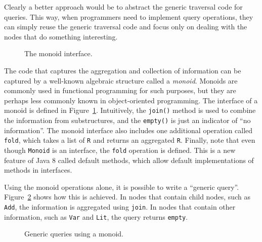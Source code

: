 Clearly a better approach would be to abstract the generic traversal
code for queries. This way, when programmers need to implement query
operations, they can simply reuse the generic traversal code and
focus only on dealing with the nodes that do something interesting.


\begin{figure}[tb]
\vspace{-.1in}
\caption{The monoid interface.}
\label{monoid}
\end{figure}

The code that captures the aggregation and collection of information
can be captured by a well-known algebraic structure called a
\emph{monoid}. Monoids are commonly used in functional programming
for such purposes, but they are perhaps less commonly known in
object-oriented programming.  The interface of a monoid is defined in
Figure~\ref{monoid}. Intuitively, the \lstinline{join()} method is
used to combine the information from substructures, and the
\lstinline{empty()} is just an indicator of ``no information''.
The monoid interface also includes one additional operation
called \lstinline{fold}, which takes a list of \lstinline{R}
and returns an aggregated \lstinline{R}. Finally, note that
even though \lstinline{Monoid} is an interface, the
\lstinline{fold} operation is defined. This is a new feature
of Java 8 called default methods, which allow default implementations
of methods in interfaces.

Using the monoid operations alone, it is possible to write a ``generic
query''. Figure~\ref{generic_query} shows how this is achieved. In
nodes that contain child nodes, such as \lstinline{Add}, the
information is aggregated using \lstinline{join}. In nodes that
contain other information, such as \lstinline{Var} and
\lstinline{Lit}, the query returns \lstinline{empty}.

\begin{figure}[tb]
\vspace{-.1in}
\caption{Generic queries using a monoid.}
\label{generic_query}
\end{figure}

